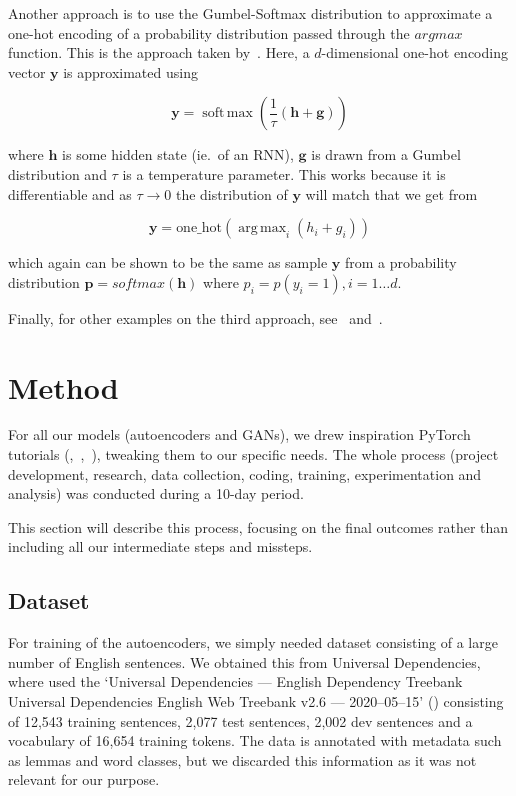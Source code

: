 \documentclass{article}
\DeclareMathOperator*{\argmax}{arg\,max}
\DeclareMathOperator*{\softmax}{soft\,max}
\begin{document}
Another approach is to use the Gumbel-Softmax distribution to approximate a
one-hot encoding of a probability distribution passed through the $argmax$
function. This is the approach taken by~\cite{kusner2016gans}. Here, a
$d$-dimensional one-hot encoding vector $\bm{y}$ is approximated using

\begin{equation}
    \bm{y} = \softmax(\frac{1}{\tau}(\bm{h}+\bm{g}))
\end{equation}

where $\bm{h}$ is some hidden state (ie.\ of an RNN), $\bm{g}$ is drawn from a
Gumbel distribution and $\tau$ is a temperature parameter. This works because it
is differentiable and as $\tau \to 0$ the distribution of $\bm{y}$ will match
that we get from

\begin{equation}
    \bm{y} = \text{one\_hot}(\argmax_{i}(h_i + g_i))
\end{equation}

which again can be shown to be the same as sample $\bm{y}$ from a probability
distribution $\bm{p} = softmax(\bm{h})$ where $p_i = p(y_i=1), i = 1\dots d$.

Finally, for other examples on the third approach,
see~\cite{donahue2018adversarial} and~\cite{haidar2019textkdgan}.


\section{Method}\label{sec:method}

For all our models (autoencoders and GANs), we drew inspiration PyTorch
tutorials
(\cite{pytorchTutorialAtt},~\cite{pytorchTutorialTransformer},~\cite{pytorchTutorialGAN}),
tweaking them to our specific needs. The whole process (project development,
research, data collection, coding, training, experimentation and analysis) was
conducted during a 10-day period.

This section will describe this process, focusing on the final outcomes rather
than including all our intermediate steps and missteps.

\subsection{Dataset}\label{sec:dataset}

For training of the autoencoders, we simply needed dataset consisting of a large
number of English sentences. We obtained this from Universal Dependencies, where
used the `Universal Dependencies --- English Dependency Treebank Universal
Dependencies English Web Treebank v2.6 --- 2020--05--15' (\cite{silveira14gold})
consisting of 12,543 training sentences, 2,077 test sentences, 2,002 dev
sentences and a vocabulary of 16,654 training tokens. The data is annotated with
metadata such as lemmas and word classes, but we discarded this information as
it was not relevant for our purpose.
\end{document}
